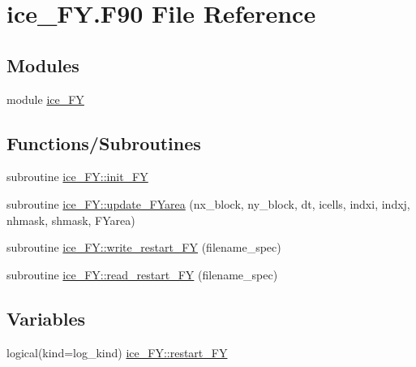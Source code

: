 \hypertarget{ice__FY_8F90}{
\section{ice\_\-FY.F90 File Reference}
\label{ice__FY_8F90}
}
\subsection*{Modules}
\begin{DoxyCompactItemize}
\item 
module \hyperlink{namespaceice__FY}{ice\_\-FY}
\end{DoxyCompactItemize}
\subsection*{Functions/Subroutines}
\begin{DoxyCompactItemize}
\item 
subroutine \hyperlink{namespaceice__FY_a91a650e4ced6612c0ab978f8b8a0c5b7}{ice\_\-FY::init\_\-FY}
\item 
subroutine \hyperlink{namespaceice__FY_a4f6f4b6c28b7204e48d62a0383b1497c}{ice\_\-FY::update\_\-FYarea} (nx\_\-block, ny\_\-block, dt, icells, indxi, indxj, nhmask, shmask, FYarea)
\item 
subroutine \hyperlink{namespaceice__FY_af12be2c743dc7e04389c68e276903b94}{ice\_\-FY::write\_\-restart\_\-FY} (filename\_\-spec)
\item 
subroutine \hyperlink{namespaceice__FY_a5befdd0bd7ac80faa33cfc53cff646a7}{ice\_\-FY::read\_\-restart\_\-FY} (filename\_\-spec)
\end{DoxyCompactItemize}
\subsection*{Variables}
\begin{DoxyCompactItemize}
\item 
logical(kind=log\_\-kind) \hyperlink{namespaceice__FY_a883caa24304b985bea44b09d23c22068}{ice\_\-FY::restart\_\-FY}
\end{DoxyCompactItemize}

